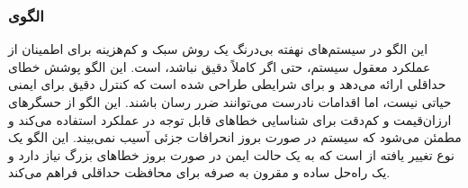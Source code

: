 \subsubsection{الگوی }
\label{archSafeSanityChkSec}
\begin{RTL}
این الگو \cite{ref4} در سیستم‌های نهفته بی‌درنگ یک روش سبک و کم‌هزینه
برای اطمینان از عملکرد معقول سیستم، حتی اگر کاملاً دقیق نباشد، است.
این الگو پوشش خطای حداقلی ارائه می‌دهد و برای شرایطی طراحی شده است که
کنترل دقیق برای ایمنی حیاتی نیست، اما اقدامات نادرست می‌توانند ضرر رسان باشند.
این الگو از حسگرهای ارزان‌قیمت و کم‌دقت برای شناسایی خطاهای قابل توجه
در عملکرد استفاده می‌کند و مطمئن می‌شود که سیستم در
صورت بروز انحرافات جزئی آسیب نمی‌بیند. این الگو یک نوع تغییر یافته از
 است که به یک حالت ایمن در صورت
بروز خطاهای بزرگ نیاز دارد و یک راه‌حل ساده و مقرون به صرفه
برای محافظت حداقلی فراهم می‌کند.
\end{RTL}